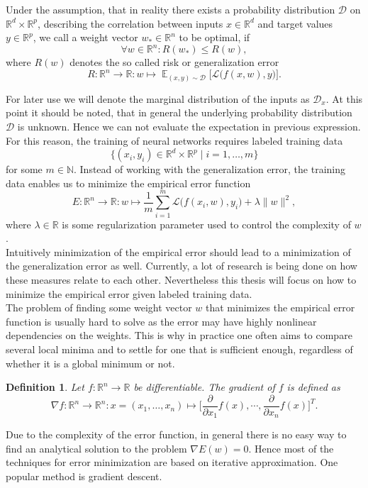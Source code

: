 \documentclass[11pt, a4paper]{article}
\newtheorem{definition}[theorem]{Definition}
\newcommand{\N}{\mathds{N}}
\newcommand{\R}{\mathds{R}}
\newcommand{\D}{\mathcal{D}}
\renewcommand{\L}{\mathcal{L}}
\DeclareMathOperator*{\E}{\mathds{E}}
\begin{document}
Under the assumption, that in reality there exists a probability distribution $\D$ on $\R^d \times \R^p$, describing the correlation between inputs $x \in \R^d$ and target values $y \in \R^p$, we call a weight vector $w_* \in \R^n$ to be optimal, if
\[ \forall w \in \R^n : R(w_*) \leq R(w), \]
where $R(w)$ denotes the so called risk or generalization error 
\[ R : \R^n \to \R : w \mapsto \E_{(x,y) \sim \D } \Big [ \L \big (f(x,w),y \big ) \Big ]. \]

For later use we will denote the marginal distribution of the inputs as $\D_x$. At this point it should be noted, that in general the underlying probability distribution $\D$ is unknown. Hence we can not evaluate the expectation in previous expression. \\

For this reason, the training of neural networks requires labeled training data
\[ \Big \{ (x_i,y_i) \in \R^d \times \R^p \mid i=1, \dots, m \Big \} \]
for some $m \in \N$. Instead of working with the generalization error, the training data enables us to minimize the empirical error function
 \[ E : \R^n \to \R : w \mapsto \frac{1}{m} \sum_{i=1}^{m} \L \big ( f(x_i,w),y_i \big) + \lambda \| w \|^2, \]
where $\lambda \in \R$ is some regularization parameter used to control the complexity of $w$. \\
 
Intuitively minimization of the empirical error should lead to a minimization of the generalization error as well. Currently, a lot of research is being done on how these measures relate to each other. Nevertheless this thesis will focus on how to minimize the empirical error given labeled training data. \\

The problem of finding some weight vector $w$ that minimizes the empirical error function is usually hard to solve as the error may have highly nonlinear dependencies on the weights. This is why in practice one often aims to compare several local minima and to settle for one that is sufficient enough, regardless of whether it is a global minimum or not.

\begin{definition}
Let $f: \R^n \to \R$ be differentiable. The gradient of $f$ is defined as
\[ \nabla f : \R^n \to \R^n : x = (x_1, \dots, x_n) \mapsto \bigg [ \frac{\partial}{\partial x_1} f(x), \cdots, \frac{\partial}{\partial x_n} f(x) \bigg ]^T. \]
\end{definition}

Due to the complexity of the error function, in general there is no easy way to find an analytical solution to the problem $\nabla E(w) = 0$. Hence most of the techniques for error minimization are based on iterative approximation. One popular method is gradient descent.
\end{document}
